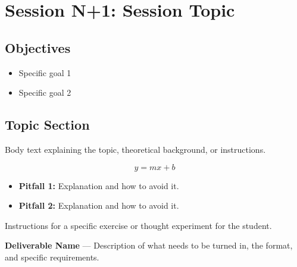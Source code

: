 \documentclass[11pt,letterpaper]{article}
\begin{document}
	\newpage
	\section{Session N+1: Session Topic}
	\label{sec:session1}
	
	\subsection{Objectives}
	
	\begin{itemize}[leftmargin=2em]
		\item Specific goal 1
		\item Specific goal 2
	\end{itemize}
	
	\subsection{Topic Section}
	
	Body text explaining the topic, theoretical background, or instructions.
	
	\begin{equation}
		y = mx + b
		\label{eq:example}
	\end{equation}
	
	\begin{tcolorbox}[warning={Common Pitfalls}]
		\begin{itemize}
			\item \textbf{Pitfall 1:} Explanation and how to avoid it.
			\item \textbf{Pitfall 2:} Explanation and how to avoid it.
		\end{itemize}
	\end{tcolorbox}
	
	\begin{tcolorbox}[infobox={Exercise: Exercise Name}]
		Instructions for a specific exercise or thought experiment for the student.
	\end{tcolorbox}
	
	\begin{tcolorbox}[deliverable={Session N+1 Deliverable}]
		\textbf{Deliverable Name} --- Description of what needs to be turned in, the format, and specific requirements.
	\end{tcolorbox}
	
\end{document}

